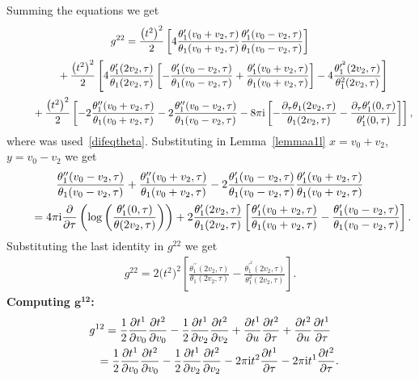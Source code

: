 \documentclass[10pt,a4paper]{amsart}
\numberwithin{equation}{section}
\begin{document}
Summing the equations we get
\begin{gather*}
g^{22}=\frac{\big(t^2\big)^2}{2}\left[4\frac{\theta_1^{\prime}(v_0+v_2,\tau)}{\theta_1(v_0+v_2,\tau)} \frac{\theta_1^{\prime}(v_0-v_2,\tau)}{\theta_1(v_0-v_2,\tau)}\right]
\\[.3ex] \hphantom{g^{22}=}
{}+\frac{\big(t^2\big)^2}{2}\left[4\frac{\theta_1^{\prime}(2v_2,\tau)}{\theta_1(2v_2,\tau)} \left[-\frac{\theta_1^{\prime}(v_0-v_2,\tau)}{\theta_1(v_0-v_2,\tau)} +\frac{\theta_1^{\prime}(v_0+v_2,\tau)}{\theta_1(v_0+v_2,\tau)}\right] -4\frac{\theta_1^{\prime^2}(2v_2,\tau)}{\theta_1^2(2v_2,\tau)}\right]
\\[.3ex] \hphantom{g^{22}=}
{}+\frac{\big(t^2\big)^2}{2}\left[-2\frac{\theta_1^{\prime\prime}(v_0+v_2,\tau)}{\theta_1(v_0+v_2,\tau)} -2\frac{\theta_1^{\prime\prime}(v_0-v_2,\tau)}{\theta_1(v_0-v_2,\tau)}-8\pi {\rm i}\left[-\frac{\partial_{\tau}\theta_1(2v_2,\tau)}{\theta_1(2v_2,\tau)} -\frac{\partial_{\tau}\theta_1^{\prime}(0,\tau)}{\theta_1^{\prime}(0,\tau)}\right]\right],
\end{gather*}
where was used~\eqref{difeqtheta}. Substituting in Lemma~\ref{lemmaa1l} $x=v_0+v_2$, $y=v_0-v_2$ we get
\begin{gather*}
\frac{\theta_1^{\prime\prime}(v_0-v_2,\tau)}{\theta_1(v_0-v_2,\tau)} +\frac{\theta_1^{\prime\prime}(v_0+v_2,\tau)}{\theta_1(v_0+v_2,\tau)} -2\frac{\theta_1^{\prime}(v_0-v_2,\tau)}{\theta_1(v_0-v_2,\tau)} \frac{\theta_1^{\prime}(v_0+v_2,\tau)}{\theta_1(v_0+v_2,\tau)}
\\[.3ex] \qquad
{}=4\pi {\rm i} \frac{\partial}{\partial \tau}\left(\log\left(\frac{\theta_1^{\prime}(0,\tau)}{\theta(2v_2,\tau)}\right)\right) +2\frac{\theta_1^{\prime}(2v_2,\tau)}{\theta_1(2v_2,\tau)} \left[\frac{\theta_1^{\prime}(v_0+v_2,\tau)}{\theta_1
(v_0+v_2,\tau)}-\frac{\theta_1^{\prime}(v_0-v_2,\tau)}{\theta_1(v_0-v_2,\tau)}\right].
\end{gather*}
Substituting the last identity in $g^{22}$ we get
\begin{gather*}
g^{22}=2\big(t^2\big)^2\left[\frac{\theta_1^{\prime\prime}(2v_2,\tau)}{\theta_1(2v_2,\tau)} -\frac{\theta_1^{\prime^2}(2v_2,\tau)}{\theta_1^2(2v_2,\tau)}\right].
\end{gather*}
\textbf{Computing $\boldsymbol {g^{12}}$:}
\begin{gather*}
g^{12}=\frac{1}{2}\frac{\partial t^1}{\partial v_0}\frac{\partial t^2}{\partial v_0}-\frac{1}{2}\frac{\partial t^1}{\partial v_2}\frac{\partial t^2}{\partial v_2}+\frac{\partial t^1}{\partial u}\frac{\partial t^2}{\partial \tau}+\frac{\partial t^2}{\partial u}\frac{\partial t^1}{\partial \tau}
\\ \hphantom{g^{12}}
{}=\frac{1}{2}\frac{\partial t^1}{\partial v_0}\frac{\partial t^2}{\partial v_0}-\frac{1}{2}\frac{\partial t^1}{\partial v_2}\frac{\partial t^2}{\partial v_2}-2\pi {\rm i}t^2\frac{\partial t^1}{\partial \tau}-2\pi {\rm i}t^1\frac{\partial t^2}{\partial \tau}.
\end{gather*}
\end{document}
